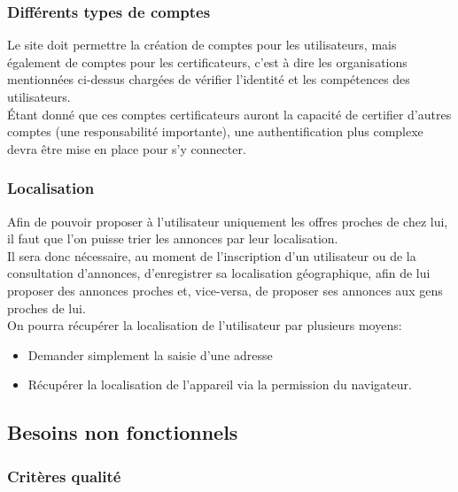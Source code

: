 \documentclass[a4paper,11pt]{article}
\begin{document}
\subsubsection{Différents types de comptes}

Le site doit permettre la création de comptes pour les utilisateurs, mais également de comptes
pour les certificateurs, c'est à dire les organisations mentionnées ci-dessus chargées de vérifier l'identité et les compétences des utilisateurs.\\

Étant donné que ces comptes certificateurs auront la capacité de certifier d'autres comptes (une responsabilité importante), une authentification plus complexe devra être mise en place pour s'y connecter.\\

\subsubsection{Localisation}

Afin de pouvoir proposer à l'utilisateur uniquement les offres proches de chez lui, il faut que l'on
puisse trier les annonces par leur localisation.\\

Il sera donc nécessaire, au moment de l'inscription d'un utilisateur ou de la consultation d'annonces, d'enregistrer sa localisation
géographique, afin de lui proposer des annonces proches et, vice-versa, de proposer ses annonces aux gens proches de lui.\\

On pourra récupérer la localisation de l'utilisateur par plusieurs moyens:\\
\begin{itemize}
  \item Demander simplement la saisie d'une adresse
  \item Récupérer la localisation de l'appareil via la permission du navigateur.
\end{itemize}


\subsection{Besoins non fonctionnels}

\subsubsection{Critères qualité}
\end{document}
